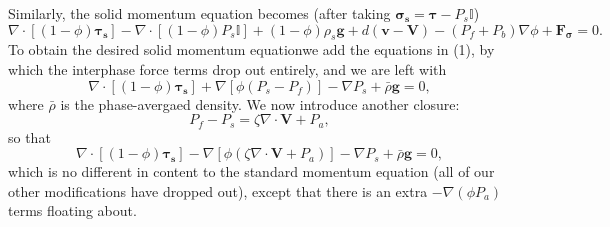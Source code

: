 \documentclass[9pt,fleqn,twoside]{article}
\theoremstyle{plain}
\theoremstyle{definition}
\theoremstyle{remark}
\begin{document}
Similarly, the solid momentum equation becomes (after taking
$\mathbf{\sigma_s} = \mathbf{\tau} - P_s \mathbb{I}$)
\begin{equation}
\nabla \cdot [(1 - \phi) \mathbf{\tau_s}] - \nabla \cdot [(1-\phi)
P_s\mathbb{I}] + (1 - \phi) \rho_s \mathbf{g} + d(\mathbf{v} -
\mathbf{V}) - (P_f + P_b) \nabla \phi +
\mathbf{F_{\sigma}} = 0.
\end{equation}
To obtain the desired solid momentum equationwe add the equations in
(1), by which the interphase force terms drop out entirely, and we are
left with
\begin{equation}
\nabla \cdot [(1 - \phi) \mathbf{\tau_s}] + \nabla [ \phi(P_s - P_f)]
- \nabla P_s + \bar{\rho}\mathbf{g} = 0,
\end{equation}
where $\bar{\rho}$ is the phase-avergaed density. We now introduce
another closure:
\begin{equation}
P_f - P_s = \zeta \nabla \cdot \mathbf{V} + P_a,
\end{equation}
so that
\begin{equation}
\nabla \cdot [(1 - \phi) \mathbf{\tau_s}] - \nabla [ \phi(\zeta \nabla \cdot \mathbf{V} + P_a)]
- \nabla P_s + \bar{\rho}\mathbf{g} = 0,
\end{equation}
which is no different in content to the standard momentum equation
(all of our other modifications have dropped out), except that there
is an extra $-\nabla (\phi P_a)$ terms floating about.
\end{document}

